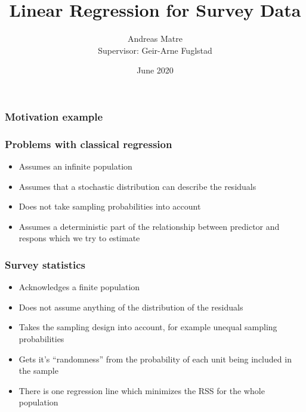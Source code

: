 \documentclass{beamer}
\title{Linear Regression for Survey Data}
\author{Andreas Matre \\
Supervisor: Geir-Arne Fuglstad}
\date{June 2020}
\begin{document}
\frame{\titlepage}


\begin{frame}
  \frametitle{Motivation example}


\end{frame}

\begin{frame}
  \frametitle{Problems with classical regression}

  \begin{itemize}
  \addtolength{\itemsep}{0.5\baselineskip}
  \item Assumes an infinite population %
  \item Assumes that a stochastic distribution can describe the residuals %
  \item Does not take sampling probabilities into account                 %
  \item Assumes a deterministic part of the relationship between predictor and
    respons which we try to estimate %
  \end{itemize}
  
\end{frame}

\begin{frame}
  \frametitle{Survey statistics}

  \begin{itemize}
  \addtolength{\itemsep}{0.5\baselineskip}
  \item Acknowledges a finite population
  \item Does not assume anything of the distribution of the residuals
  \item Takes the sampling design into account, for example unequal sampling
      probabilities
  \item Gets it's ``randomness'' from the probability of each unit being
      included in the sample
  \item There is one regression line which minimizes the RSS for the whole
    population %
  \end{itemize}
  
\end{frame}
\end{document}
